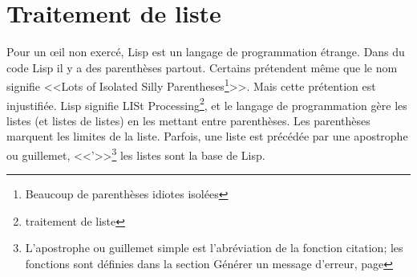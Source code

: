 \chapter{Traitement de liste}

Pour un \oe{}il non exercé, Lisp est un langage de programmation
étrange. Dans du code Lisp il y a des parenthèses partout. Certains
prétendent même que le nom signifie <<Lots of Isolated Silly
Parentheses\footnote{Beaucoup de parenthèses idiotes isolées}>>. Mais
cette prétention est injustifiée. Lisp signifie LISt
Processing\footnote{traitement de liste}, et le langage de
programmation gère les listes (et listes de listes) en les mettant entre
parenthèses. Les parenthèses marquent les limites de la
liste. Parfois, une liste est précédée par une apostrophe ou
guillemet, <<'>>\footnote{L'apostrophe ou guillemet simple est
  l'abréviation de la fonction citation; les fonctions sont définies
  dans la section  Générer un message d'erreur,
  page} les listes sont la base de Lisp.












 












